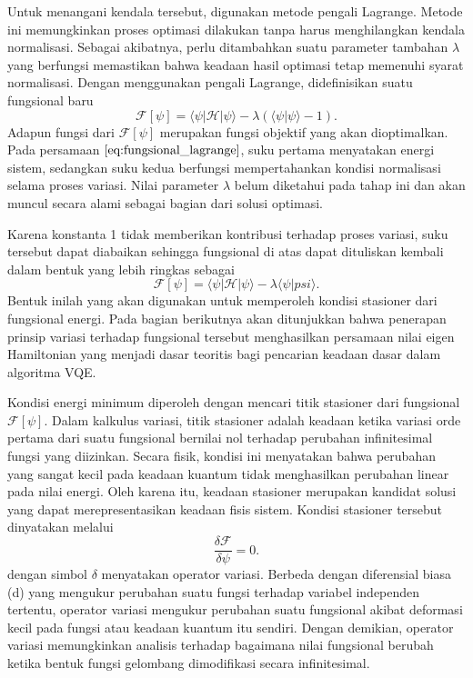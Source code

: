 Untuk menangani kendala tersebut, digunakan metode pengali Lagrange. Metode ini memungkinkan proses optimasi dilakukan tanpa harus menghilangkan kendala normalisasi. Sebagai akibatnya, perlu ditambahkan suatu parameter tambahan $\lambda$ yang berfungsi memastikan bahwa keadaan hasil optimasi tetap memenuhi syarat normalisasi. Dengan menggunakan pengali Lagrange, didefinisikan suatu fungsional baru
\begin{equation}
    \label{eq:fungsional_lagrange}
    \mathcal{F}[\psi] = \langle \psi | \mathcal{H} | \psi \rangle - \lambda \left( \langle \psi | \psi \rangle - 1 \right).
\end{equation}
Adapun fungsi dari $\mathcal{F}[\psi]$ merupakan fungsi objektif yang akan dioptimalkan. Pada persamaan $\ref{eq:fungsional_lagrange}$, suku pertama menyatakan energi sistem, sedangkan suku kedua berfungsi mempertahankan kondisi normalisasi selama proses variasi. Nilai parameter $\lambda$ belum diketahui pada tahap ini dan akan muncul secara alami sebagai bagian dari solusi optimasi. 

Karena konstanta 1 tidak memberikan kontribusi terhadap proses variasi, suku tersebut dapat diabaikan sehingga fungsional di atas dapat dituliskan kembali dalam bentuk yang lebih ringkas sebagai
\begin{equation}
    \label{eq:fungsional_lagrange_2}
    \mathcal{F}[\psi] = \langle \psi | \mathcal{H} | \psi \rangle - \lambda \langle\psi|psi\rangle.
\end{equation}
Bentuk inilah yang akan digunakan untuk memperoleh kondisi stasioner dari fungsional energi. Pada bagian berikutnya akan ditunjukkan bahwa penerapan prinsip variasi terhadap fungsional tersebut menghasilkan persamaan nilai eigen Hamiltonian yang menjadi dasar teoritis bagi pencarian keadaan dasar dalam algoritma VQE.

Kondisi energi minimum diperoleh dengan mencari titik stasioner dari fungsional $\mathcal{F}[\psi]$. Dalam kalkulus variasi, titik stasioner adalah keadaan ketika variasi orde pertama dari suatu fungsional bernilai nol terhadap perubahan infinitesimal fungsi yang diizinkan. Secara fisik, kondisi ini menyatakan bahwa perubahan yang sangat kecil pada keadaan kuantum tidak menghasilkan perubahan linear pada nilai energi. Oleh karena itu, keadaan stasioner merupakan kandidat solusi yang dapat merepresentasikan keadaan fisis sistem. Kondisi stasioner tersebut dinyatakan melalui
\begin{equation}
    \label{eq:kondisi_stasioner}
    \frac{\delta \mathcal{F}}{\delta \psi} = 0.
\end{equation}
dengan simbol $\delta$ menyatakan operator variasi. Berbeda dengan diferensial biasa (d) yang mengukur perubahan suatu fungsi terhadap variabel independen tertentu, operator variasi mengukur perubahan suatu fungsional akibat deformasi kecil pada fungsi atau keadaan kuantum itu sendiri. Dengan demikian, operator variasi memungkinkan analisis terhadap bagaimana nilai fungsional berubah ketika bentuk fungsi gelombang dimodifikasi secara infinitesimal.

